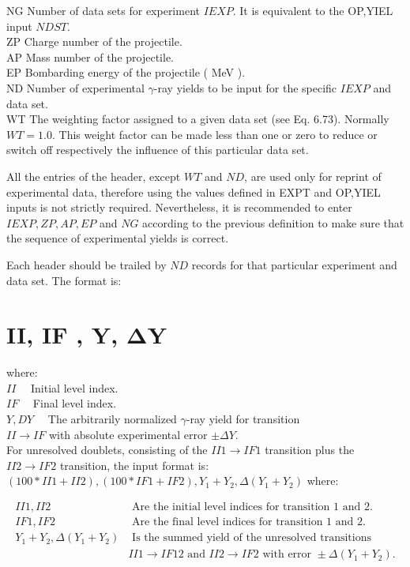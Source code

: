 \documentclass[10pt]{article}
\begin{document}
NG Number of data sets for experiment $I E X P$. It is equivalent to the OP,YIEL input $N D S T$.\\
ZP Charge number of the projectile.\\
AP Mass number of the projectile.\\
EP Bombarding energy of the projectile ( MeV ).\\
ND Number of experimental $\gamma$-ray yields to be input for the specific $I E X P$ and data set.\\
WT The weighting factor assigned to a given data set (see Eq. 6.73). Normally $W T=1.0$. This weight factor can be made less than one or zero to reduce or switch off respectively the influence of this particular data set.

All the entries of the header, except $W T$ and $N D$, are used only for reprint of experimental data, therefore using the values defined in EXPT and OP,YIEL inputs is not strictly required. Nevertheless, it is recommended to enter $I E X P, Z P, A P, E P$ and $N G$ according to the previous definition to make sure that the sequence of experimental yields is correct.

Each header should be trailed by $N D$ records for that particular experiment and data set. The format is:

\section*{II, IF , Y, $\boldsymbol{\Delta} \mathbf{Y}$}
where:\\
$I I \quad$ Initial level index.\\
$I F \quad$ Final level index.\\
$Y, D Y \quad$ The arbitrarily normalized $\gamma$-ray yield for transition\\
$I I \rightarrow I F$ with absolute experimental error $\pm \Delta Y$.\\
For unresolved doublets, consisting of the $I I 1 \rightarrow I F 1$ transition plus the $I I 2 \rightarrow I F 2$ transition, the input format is: $(100 * I I 1+I I 2),(100 * I F 1+I F 2), Y_{1}+Y_{2}, \Delta\left(Y_{1}+Y_{2}\right)$ where:

$$
\begin{array}{ll}
I I 1, I I 2 & \text { Are the initial level indices for transition } 1 \text { and } 2 . \\
I F 1, I F 2 & \text { Are the final level indices for transition } 1 \text { and } 2 . \\
Y_{1}+Y_{2}, \Delta\left(Y_{1}+Y_{2}\right) & \text { Is the summed yield of the unresolved transitions } \\
& I I 1 \rightarrow I F 12 \text { and } I I 2 \rightarrow I F 2 \text { with error } \pm \Delta\left(Y_{1}+Y_{2}\right) .
\end{array}
$$
\end{document}
